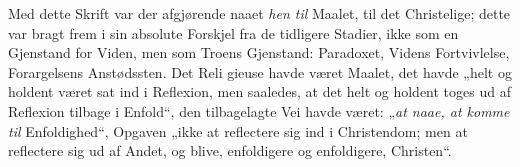 \documentclass[12pt,a4paper]{book}
\newcommand{\opage}[1]{\marginnote{\footnotesize\textit{[#1]}}}
\begin{document}
Med dette Skrift var der afgjørende naaet \emph{hen til} Maalet, til det
Christelige; dette var bragt frem i sin absolute Forskjel fra de tidligere
Stadier, ikke som en Gjenstand for Viden, men som Troens Gjenstand:
Paradoxet, Videns Fortvivlelse, Forargelsens Anstødssten. Det Reli%
\opage{1180}gieuse havde været Maalet, det havde „helt og holdent været sat ind i Reflexion, men saaledes, at det helt og holdent toges ud af Reflexion tilbage i Enfold“, den tilbagelagte Vei havde været: „\emph{at naae, at komme til} Enfoldighed“, Opgaven „ikke at reflectere sig ind i Christendom; men at reflectere sig ud af Andet, og blive, enfoldigere og enfoldigere, Christen“.
\end{document}
